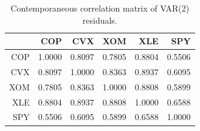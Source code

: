 \begin{table}[ht]
\centering
\caption{Contemporaneous correlation matrix of VAR(2) residuals.} 
\label{tab:var_resid_cor}
\begin{tabular}{rrrrrr}
  \toprule
 & COP & CVX & XOM & XLE & SPY \\ 
  \midrule
COP & 1.0000 & 0.8097 & 0.7805 & 0.8804 & 0.5506 \\ 
  CVX & 0.8097 & 1.0000 & 0.8363 & 0.8937 & 0.6095 \\ 
  XOM & 0.7805 & 0.8363 & 1.0000 & 0.8808 & 0.5899 \\ 
  XLE & 0.8804 & 0.8937 & 0.8808 & 1.0000 & 0.6588 \\ 
  SPY & 0.5506 & 0.6095 & 0.5899 & 0.6588 & 1.0000 \\ 
   \bottomrule
\end{tabular}
\end{table}

